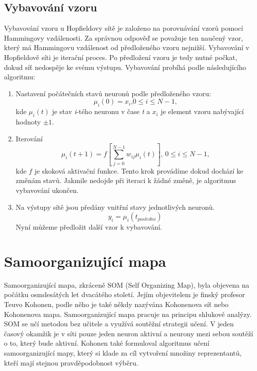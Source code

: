\documentclass[11pt,twoside,a4paper]{book}
\begin{document}
\subsection{Vybavování vzoru}
Vybavování vzoru u Hopfieldovy sítě je založeno na porovnávání vzorů pomocí Hammingovy vzdálenosti. Za správnou odpověď se považuje ten naučený vzor, který má Hammingovu vzdálenost od předloženého vzoru nejnižší.
Vybavování v Hopfieldově síti je iterační proces. Po předložení vzoru je tedy nutné počkat, dokud síť nedospěje ke svému výstupu.
Vybavování probíhá podle následujícího algoritmu\cite{skripta}:
\begin{enumerate}
\item Nastavení počátečních stavů neuronů podle předloženého vzoru:
\begin{equation}
\mu_{i}(0)=x_{i}\mbox{,}0\leq i\leq N-1 \mbox{,}
\end{equation}
kde $\mu_{i}(t)$ je stav \textit{i}-tého neuronu v čase \textit{t} a $x_{i}$ je element vzoru nabývající hodnoty $\pm 1$.
\item Iterování 
\begin{equation}
\mu_{i}(t+1)=f\left[\sum\limits_{j=0}^{N-1}w_{ij}\mu_{i}(t) \right]\mbox{, }0\leq i\leq N-1 \mbox{,}
\end{equation}
kde $f$ je skoková aktivační funkce. Tento krok provádíme dokud dochází ke změnám stavů. Jakmile nedojde při iteraci k žádné změně, je algoritmus vybavování ukončen.
\item Na výstupy sítě jsou předány vnitřní stavy jednotlivých neuronů.
\begin{equation}
y_{i}=\mu_{i}(t_{posledni})
\end{equation}
Nyní můžeme předložit další vzor k vybavování.
\end{enumerate}
\section{Samoorganizující mapa}
Samoorganizující mapa, zkráceně SOM (Self Organizing Map), byla objevena na počátku osmdesátých let dvacátého století. Jejím objevitelem je finský profesor Teuvo Kohonen, podle něho je také někdy nazývána Kohonenova síť nebo Kohonenova mapa. Samoorganizující mapa pracuje na principu shlukové analýzy. SOM se učí metodou bez učitele a využívá soutěžní strategii učení. V jeden časový okamžik je v síti pouze jeden neuron aktivní a neurony mezi sebou soutěží o to, který bude aktivní. Kohonen také formuloval algoritmus učení samoorganizující mapy, který si klade za cíl vytvoření množiny reprezentantů, kteří mají stejnou pravděpodobnost výběru.\cite{teoret} 
\end{document}
